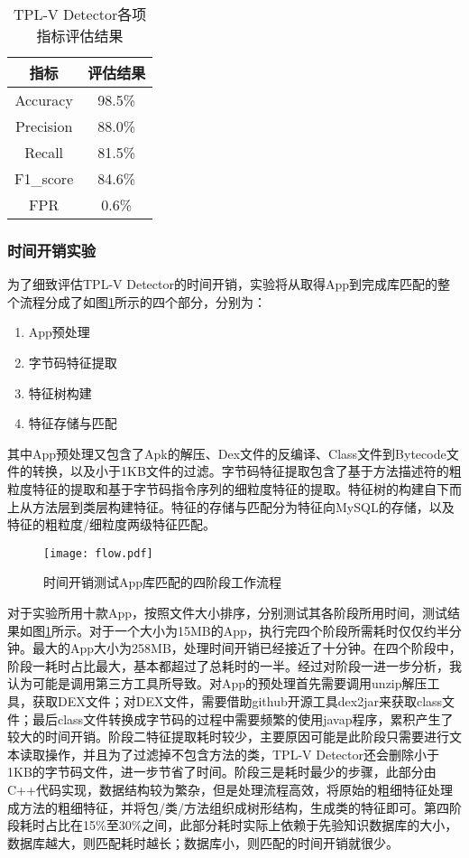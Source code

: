 \begin{table}[!hpt]
  \caption{TPL-V Detector各项指标评估结果}
  \label{tab:metric}
  \centering
  \begin{tabular}{cc} \toprule
    指标 &  评估结果 \\ \midrule
	Accuracy & 98.5\% \\
	Precision & 88.0\% \\
	Recall & 81.5\% \\
	F1\_score & 84.6\% \\
	FPR & 0.6\% \\
	 \bottomrule
  \end{tabular}
\end{table}


\subsubsection{时间开销实验}

为了细致评估TPL-V Detector的时间开销，实验将从取得App到完成库匹配的整个流程分成了如图\ref{fig:flow}所示的四个部分，分别为：
\begin{enumerate}
\item {App预处理}
\item {字节码特征提取}
\item {特征树构建}
\item {特征存储与匹配}
\end{enumerate}
其中App预处理又包含了Apk的解压、Dex文件的反编译、Class文件到Bytecode文件的转换，以及小于1KB文件的过滤。字节码特征提取包含了基于方法描述符的粗粒度特征的提取和基于字节码指令序列的细粒度特征的提取。特征树的构建自下而上从方法层到类层构建特征。特征的存储与匹配分为特征向MySQL的存储，以及特征的粗粒度/细粒度两级特征匹配。


\begin{figure}[!htp]
  \centering
  \texttt{[image: flow.pdf]} \\
  \caption{时间开销测试App库匹配的四阶段工作流程}
 \label{fig:flow}
\end{figure}

对于实验所用十款App，按照文件大小排序，分别测试其各阶段所用时间，测试结果如图\ref{fig:flow}所示。对于一个大小为15MB的App，执行完四个阶段所需耗时仅仅约半分钟。最大的App大小为258MB，处理时间开销已经接近了十分钟。在四个阶段中，阶段一耗时占比最大，基本都超过了总耗时的一半。经过对阶段一进一步分析，我认为可能是调用第三方工具所导致。对App的预处理首先需要调用unzip解压工具，获取DEX文件；对DEX文件，需要借助github开源工具dex2jar来获取class文件；最后class文件转换成字节码的过程中需要频繁的使用javap程序，累积产生了较大的时间开销。阶段二特征提取耗时较少，主要原因可能是此阶段只需要进行文本读取操作，并且为了过滤掉不包含方法的类，TPL-V Detector还会删除小于1KB的字节码文件，进一步节省了时间。阶段三是耗时最少的步骤，此部分由C++代码实现，数据结构较为繁杂，但是处理流程高效，将原始的粗细特征处理成方法的粗细特征，并将包/类/方法组织成树形结构，生成类的特征即可。第四阶段耗时占比在15\%至30\%之间，此部分耗时实际上依赖于先验知识数据库的大小，数据库越大，则匹配耗时越长；数据库小，则匹配的时间开销就很少。




